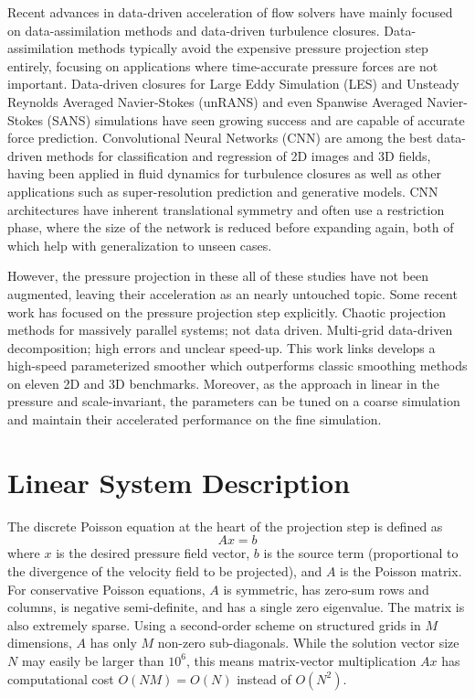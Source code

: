 \documentclass[review]{elsarticle}
\begin{document}
Recent advances in data-driven acceleration of flow solvers have mainly focused on data-assimilation methods and data-driven turbulence closures. Data-assimilation methods typically avoid the expensive pressure projection step entirely, focusing on applications where time-accurate pressure forces are not important. Data-driven closures for Large Eddy Simulation (LES) and Unsteady Reynolds Averaged Navier-Stokes (unRANS) and even Spanwise Averaged Navier-Stokes (SANS) simulations have seen growing success and are capable of accurate force prediction. Convolutional Neural Networks (CNN) are among the best data-driven methods for classification and regression of 2D images and 3D fields, having been applied in fluid dynamics for turbulence closures as well as other applications such as super-resolution prediction and generative models. CNN architectures have inherent translational symmetry and often use a restriction phase, where the size of the network is reduced before expanding again, both of which help with generalization to unseen cases. 

However, the pressure projection in these all of these studies have not been augmented, leaving their acceleration as an nearly untouched topic. Some recent work has focused on the pressure projection step explicitly. Chaotic projection methods for massively parallel systems; not data driven. Multi-grid data-driven decomposition; high errors and unclear speed-up. This work links develops a high-speed parameterized smoother which outperforms classic smoothing methods on eleven 2D and 3D benchmarks. Moreover, as the approach in linear in the pressure and scale-invariant, the parameters can be tuned on a coarse simulation and maintain their accelerated performance on the fine simulation. 

\section{Linear System Description}

The discrete Poisson equation at the heart of the projection step is defined as
\begin{equation}\label{eq:axb}
    A x = b
\end{equation}
where $x$ is the desired pressure field vector, $b$ is the source term (proportional to the divergence of the velocity field to be projected), and $A$ is the Poisson matrix. For conservative Poisson equations, $A$ is symmetric, has zero-sum rows and columns, is negative semi-definite, and has a single zero eigenvalue. The matrix is also extremely sparse. Using a second-order scheme on structured grids in $M$ dimensions, $A$ has only $M$ non-zero sub-diagonals. While the solution vector size $N$ may easily be larger than $10^6$, this means matrix-vector multiplication $Ax$ has computational cost $O(NM)=O(N)$ instead of $O(N^2)$.
\end{document}
